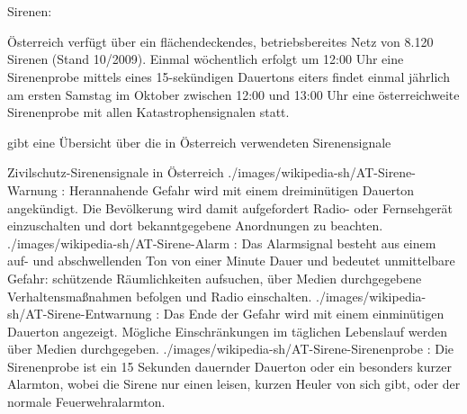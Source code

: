 \documentclass[
ngerman,
paper=a4,
asymmetric,
fontsize=10pt,
headings=small,
draft=false,
numbers=noenddot,
bibtotocnumbered,
footnotes=multiple,
toc=flat,
]{scrreprt}
\newcommand{\Neu}{\fontfamily{lmtt}\fontseries{lc}\selectfont\color{DarkGreen}}
\begin{document}
\section{\CO{[KHD]}}
  \begin{enumerate}
    \item Sirenen:
    
    {\Neu Österreich verfügt über ein flächendeckendes,
betriebsbereites Netz von 8.120 Sirenen (Stand 10/2009).
Einmal wöchentlich erfolgt um 12:00 Uhr eine Sirenenprobe
mittels eines 15-sekündigen Dauertons
eiters  findet einmal jährlich am ersten Samstag im
Oktober zwischen 12:00 und 13:00 Uhr eine österreichweite
Sirenenprobe mit allen Katastrophensignalen statt.
\cite{wiki:zivilschutzsignale20120810}
    
 gibt eine
Übersicht über die in Österreich verwendeten Sirenensignale
    \item 
    
    \begin{PictureSeriesWide}{}{Zivilschutz-Sirenensignale in
Österreich\label{fig:zvivilschutz-sirenensignale-at}}
{./images/wikipedia-sh/AT-Sirene-Warnung}
{: Herannahende Gefahr wird mit einem
dreiminütigen Dauerton angekündigt. Die Bevölkerung wird
damit aufgefordert Radio- oder Fernsehgerät einzuschalten
und dort bekanntgegebene Anordnungen zu beachten.
}
{./images/wikipedia-sh/AT-Sirene-Alarm}
{: Das Alarmsignal besteht aus einem auf- und
abschwellenden Ton von einer Minute Dauer und bedeutet unmittelbare Gefahr:
schützende Räumlichkeiten aufsuchen, über Medien durchgegebene
Verhaltensmaßnahmen befolgen und Radio
einschalten. 
}
{./images/wikipedia-sh/AT-Sirene-Entwarnung}
{: Das Ende der Gefahr wird mit einem
einminütigen Dauerton angezeigt. Mögliche Einschränkungen im täglichen Lebenslauf
werden über Medien
durchgegeben.
}
{./images/wikipedia-sh/AT-Sirene-Sirenenprobe}
{: Die Sirenenprobe ist ein 15 Sekunden
dauernder Dauerton oder ein besonders kurzer Alarmton, wobei die Sirene nur einen
leisen, kurzen Heuler von sich gibt, oder der normale
Feuerwehralarmton.
}
% 


\end{PictureSeriesWide}}
\end{enumerate}
\end{document}
